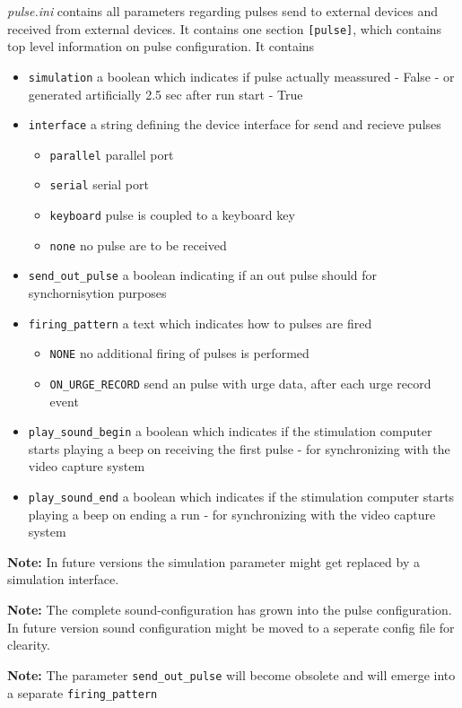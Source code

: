 \documentclass[12pt,a4paper]{book}
\begin{document}
\textit{pulse.ini} contains all parameters regarding pulses send to external devices and received from external devices. It contains one section \verb|[pulse]|, which contains top level information on pulse configuration. It contains 
\begin{itemize}
	\item \verb|simulation| a boolean which indicates if pulse actually meassured - False - or generated artificially 2.5 sec after run start - True
	\item \verb|interface| a string defining the device interface for send and recieve pulses 
	\begin{itemize}
		\item \verb|parallel| parallel port
		\item \verb|serial| serial port
		\item \verb|keyboard| pulse is coupled to a keyboard key
		\item \verb|none| no pulse are to be received
	\end{itemize}
	\item \verb|send_out_pulse|  a boolean indicating if an out pulse should for synchornisytion purposes
	\item \verb|firing_pattern|  a text which indicates how to pulses are fired
	\begin{itemize}
		\item \verb|NONE|  no additional firing of pulses is performed
		\item \verb|ON_URGE_RECORD|  send an pulse with urge data, after each urge record event
	\end{itemize}  
	\item \verb|play_sound_begin|  a boolean which indicates if the stimulation computer starts playing a beep on receiving the first pulse - for synchronizing with the video capture system
	\item \verb|play_sound_end|  a boolean which indicates if the stimulation computer starts playing a beep on ending a run - for synchronizing with the video capture system
\end{itemize}

\textbf{Note:} In future versions the simulation parameter might get replaced by a simulation interface.

\textbf{Note:} The complete sound-configuration has grown into the pulse configuration. In future version sound configuration might be moved to a seperate config file for clearity.

\textbf{Note:} The parameter \verb|send_out_pulse| will become obsolete and will emerge into a separate \verb|firing_pattern|
\end{document}
